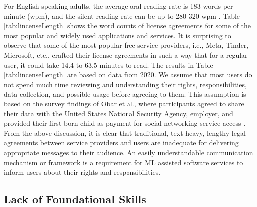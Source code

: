 \documentclass[manuscript,review,anonymous]{acmart}
\begin{document}
	For English-speaking adults, the average oral reading rate is 183 words per minute (wpm), and the silent reading rate can be up to 280-320 wpm \cite{brysbaert_how_2019, obar_biggest_2016}. Table \ref{tab:lincenseLength} shows the word counts of license agreements for some of the most popular and widely used applications and services. It is surprising to observe that some of the most popular free service providers, i.e., Meta, Tinder, Microsoft, etc., crafted their license agreements in such a way that for a regular user, it could take 14.4 to 63.5 minutes to read. The results in Table \ref{tab:lincenseLength} are based on data from 2020. We assume that most users do not spend much time reviewing and understanding their rights, responsibilities, data collection, and possible usage before agreeing to them. This assumption is based on the survey findings of Obar et al., where participants agreed to share their data with the United States National Security Agency, employer, and provided their first-born child as payment for social networking service access \cite{obar_biggest_2016}. From the above discussion, it is clear that traditional, text-heavy, lengthy legal agreements between service providers and users are inadequate for delivering appropriate messages to their audience. An easily understandable communication mechanism or framework is a requirement for ML assisted software services to inform users about their rights and responsibilities.

	\begin{table}[h!]
		\centering
		\caption{License Length and Reading Time \cite{lepan_visualizing_2020}}
		\label{tab:lincenseLength}
		
	\end{table}

\subsection{Lack of Foundational Skills}
\end{document}
